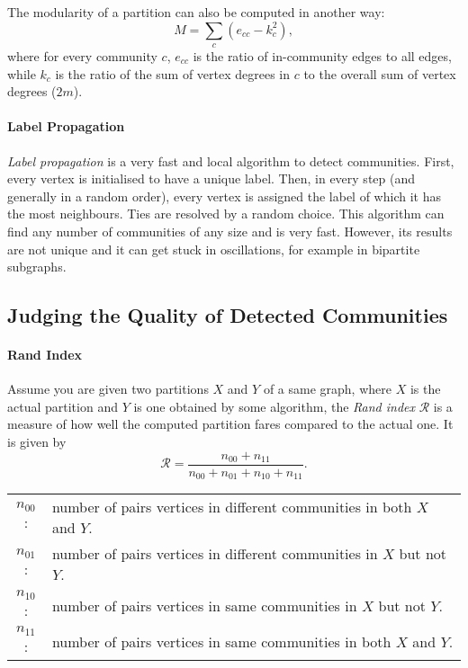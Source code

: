 \documentclass[english]{panikzettel}
\begin{document}
The modularity of a partition can also be computed in another way: $$M = \sum_c \left(e_{cc} - k_c^2\right),$$ where for every community $c$, $e_{cc}$ is the ratio of in-community edges to all edges, while $k_c$ is the ratio of the sum of vertex degrees in $c$ to the overall sum of vertex degrees ($2m$).

\paragraph{Label Propagation}
\textit{Label propagation} is a very fast and local algorithm to detect communities.
First, every vertex is initialised to have a unique label.
Then, in every step (and generally in a random order), every vertex is assigned the label of which it has the most neighbours.
Ties are resolved by a random choice.
This algorithm can find any number of communities of any size and is very fast.
However, its results are not unique and it can get stuck in oscillations, for example in bipartite subgraphs.

\subsection{Judging the Quality of Detected Communities}

\paragraph{Rand Index}
Assume you are given two partitions $X$ and $Y$ of a same graph, where $X$ is the actual partition and $Y$ is one obtained by some algorithm, the \emph{Rand index} $\mathcal{R}$ is a measure of how well the computed partition fares compared to the actual one.
It is given by
\[
    \mathcal{R} = \frac{n_{00} + n_{11}}{n_{00} + n_{01} + n_{10} + n_{11}}.
\]

\begin{center}
    \begin{tabular}{cl}
        $n_{00}$: & number of pairs vertices in different communities in both $X$ and $Y$. \\
        $n_{01}$: & number of pairs vertices in different communities in $X$ but not $Y$. \\
        $n_{10}$: & number of pairs vertices in same communities in $X$ but not $Y$. \\
        $n_{11}$: & number of pairs vertices in same communities in both $X$ and $Y$. \\
    \end{tabular}
\end{center}
\end{document}
